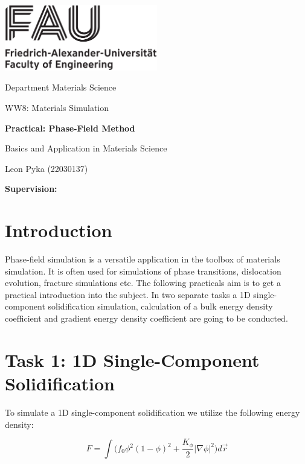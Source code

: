 




%
\begin{titlepage}
\begin{center}
\includegraphics[width=0.5\textwidth]{graphics/FAU_TechFak_EN_H_black.eps}

\LARGE Department Materials Science

\Large WW8: Materials Simulation

\LARGE \textbf{Practical: Phase-Field Method}

\Large Basics and Application in Materials Science



\vfil
\Large Leon Pyka (22030137)



\Large \textbf{Supervision: }
\end{center}

\thispagestyle{empty}
%
\end{titlepage}
%

\setcounter{page}{1}

\tableofcontents
\newpage
\section{Introduction}
Phase-field simulation is a versatile application in the toolbox of materials simulation. It is often used for simulations of phase transitions, dislocation evolution, fracture simulations etc. The following practicals aim is to get a practical introduction into the subject. In two separate tasks a 1D single-component solidification simulation, calculation of a bulk energy density coefficient and gradient energy density coefficient are going to be conducted. 

\section{Task 1: 1D Single-Component Solidification}

To simulate a 1D single-component solidification we utilize the following energy density:

\begin{equation}
	F = \int \bigl( f_{0} \phi^{2}(1- \phi)^{2}  + \frac{K_{\phi}}{2} \lvert \nabla \phi \rvert ^{2} \bigr) d \vec{r}
\end{equation}

